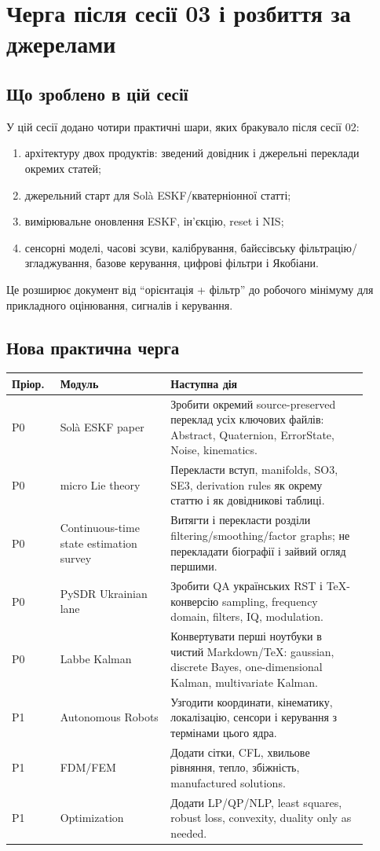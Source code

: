 
\chapter{Черга після сесії 03 і розбиття за джерелами}

\section{Що зроблено в цій сесії}

У цій сесії додано чотири практичні шари, яких бракувало після сесії 02:

\begin{enumerate}
\item архітектуру двох продуктів: зведений довідник і джерельні переклади окремих статей;
\item джерельний старт для Solà ESKF/кватерніонної статті;
\item вимірювальне оновлення ESKF, ін'єкцію, reset і NIS;
\item сенсорні моделі, часові зсуви, калібрування, байєсівську фільтрацію/згладжування, базове керування, цифрові фільтри і Якобіани.
\end{enumerate}

Це розширює документ від ``орієнтація + фільтр'' до робочого мінімуму для прикладного оцінювання, сигналів і керування.

\section{Нова практична черга}

\begin{longtable}{L{0.12\linewidth}L{0.28\linewidth}L{0.50\linewidth}}
\toprule
Пріор. & Модуль & Наступна дія\\
\midrule
P0 & Solà ESKF paper & Зробити окремий source-preserved переклад усіх ключових файлів: Abstract, Quaternion, ErrorState, Noise, kinematics.\\
P0 & micro Lie theory & Перекласти вступ, manifolds, SO3, SE3, derivation rules як окрему статтю і як довідникові таблиці.\\
P0 & Continuous-time state estimation survey & Витягти і перекласти розділи filtering/smoothing/factor graphs; не перекладати біографії і зайвий огляд першими.\\
P0 & PySDR Ukrainian lane & Зробити QA українських RST і TeX-конверсію sampling, frequency domain, filters, IQ, modulation.\\
P0 & Labbe Kalman & Конвертувати перші ноутбуки в чистий Markdown/TeX: gaussian, discrete Bayes, one-dimensional Kalman, multivariate Kalman.\\
P1 & Autonomous Robots & Узгодити координати, кінематику, локалізацію, сенсори і керування з термінами цього ядра.\\
P1 & FDM/FEM & Додати сітки, CFL, хвильове рівняння, тепло, збіжність, manufactured solutions.\\
P1 & Optimization & Додати LP/QP/NLP, least squares, robust loss, convexity, duality only as needed.\\
\bottomrule
\end{longtable}

